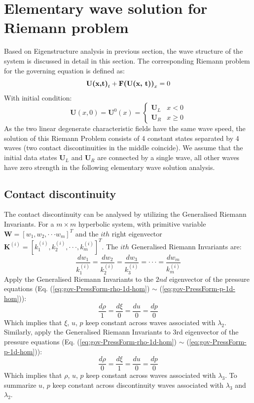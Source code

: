 \section{Elementary wave solution for Riemann problem}
Based on Eigenstructure analysis in previous section, the wave structure of the system is discussed in detail in this section. 
The corresponding Riemann problem for the governing equation is defined as: 
\begin{equation}
\textbf{U(x,t)}_t + \textbf{F(\textbf{U}(x, t))}_x = 0
\end{equation}
With initial condition: 
\begin{equation}
\textbf{U}(x, 0) = \textbf{U}^0(x) = \begin{cases} 
      \textbf{U}_L & x< 0\\
      \textbf{U}_R & x\geq 0
\end{cases}
\end{equation}
As the two linear degenerate characteristic fields have the same wave speed, the solution of this Riemann Problem consists of 4 constant states separated by 4 waves (two contact discontinuities in the middle coincide). 
We assume that the initial data states $\textbf{U}_L$ and $\textbf{U}_R$ are connected by a single wave, all other waves have zero strength in the following elementary wave solution analysis.

\subsection{Contact discontinuity}
The contact discontinuity can be analysed by utilizing the Generalised Riemann Invariants. For a $m \times m$ hyperbolic system, with primitive variable $\textbf{W} = \left[ w_1, w_2, \cdot \cdot \cdot w_m \right]^T$ and the $ith$ right eigenvector $\textbf{K}^{(i)}=[k^{(i)}_1,k^{(i)}_2, \cdot\cdot\cdot, k^{(i)}_m]^T$. The $ith$ Generalised Riemann Invariants \citep{jeffreyquasilinear} are: 
\begin{equation}
\frac{dw_1}{k^{(i)}_1}=\frac{dw_2}{k^{(i)}_2}=\frac{dw_3}{k^{(i)}_3}=\cdot\cdot\cdot=\frac{dw_m}{k^{(i)}_m}
\label{eq:Generalised-Riemann-Invariants}
\end{equation}
Apply the Generalised Riemann Invariants to the $2nd$ eigenvector of the pressure equations (Eq. (\ref{eq:gov-PressForm-rho-1d-hom}) $\sim$ (\ref{eq:gov-PressForm-p-1d-hom})): 
\begin{equation}
\frac{d \rho}{1}=\frac{d \xi}{0} = \frac{d u}{0} = \frac{d p}{0}
\end{equation}
Which implies that $\xi$, $u$, $p$ keep constant across waves associated with $\lambda_2$. 
Similarly, apply the Generalised Riemann Invariants to 3rd eigenvector of the pressure equations (Eq. (\ref{eq:gov-PressForm-rho-1d-hom}) $\sim$ (\ref{eq:gov-PressForm-p-1d-hom})):
\begin{equation}
\frac{d \rho}{0}=\frac{d \xi}{1} = \frac{d u}{0} = \frac{d p}{0}
\end{equation}
Which implies that $\rho$, $u$, $p$ keep constant across waves associated with $\lambda_3$.
To summarize $u$, $p$ keep constant across discontinuity waves associated with $\lambda_3$ and $\lambda_2$.

